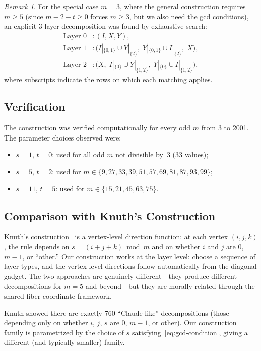 \documentclass[11pt]{article}
\theoremstyle{definition}
\theoremstyle{remark}
\newtheorem{remark}[theorem]{Remark}
\begin{document}
\begin{remark}
For the special case $m = 3$, where the general construction requires $m \geq 5$ (since $m - 2 - t \geq 0$ forces $m \geq 3$, but we also need the gcd conditions), an explicit 3-layer decomposition was found by exhaustive search:
\begin{align*}
    \text{Layer } 0&: (I, X, Y), \\
    \text{Layer } 1&: \bigl(I|_{\{0,1\}} \cup Y|_{\{2\}}, \; Y|_{\{0,1\}} \cup I|_{\{2\}}, \; X\bigr), \\
    \text{Layer } 2&: \bigl(X, \; I|_{\{0\}} \cup Y|_{\{1,2\}}, \; Y|_{\{0\}} \cup I|_{\{1,2\}}\bigr),
\end{align*}
where subscripts indicate the rows on which each matching applies.
\end{remark}

\subsection{Verification}

The construction was verified computationally for every odd $m$ from 3 to 2001. The parameter choices observed were:
\begin{itemize}
    \item $s = 1$, $t = 0$: used for all odd $m$ not divisible by~3 (33 values);
    \item $s = 5$, $t = 2$: used for $m \in \{9, 27, 33, 39, 51, 57, 69, 81, 87, 93, 99\}$;
    \item $s = 11$, $t = 5$: used for $m \in \{15, 21, 45, 63, 75\}$.
\end{itemize}

\subsection{Comparison with Knuth's Construction}

Knuth's construction~\cite{knuth2026} is a vertex-level direction function: at each vertex $(i,j,k)$, the rule depends on $s = (i+j+k) \bmod m$ and on whether $i$ and $j$ are $0$, $m-1$, or ``other.'' Our construction works at the layer level: choose a sequence of layer types, and the vertex-level directions follow automatically from the diagonal gadget. The two approaches are genuinely different---they produce different decompositions for $m = 5$ and beyond---but they are morally related through the shared fiber-coordinate framework.

Knuth showed there are exactly 760 ``Claude-like'' decompositions (those depending only on whether $i$, $j$, $s$ are $0$, $m-1$, or other). Our construction family is parametrized by the choice of $s$ satisfying~\eqref{eq:gcd-condition}, giving a different (and typically smaller) family.
\end{document}
